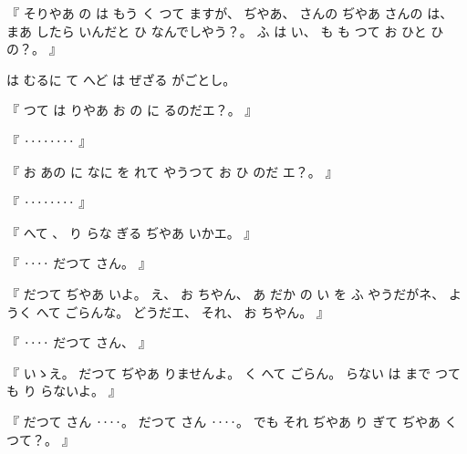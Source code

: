 %
『
そりやあ
の
は
もう
く
つて
ますが、
%
ぢやあ、
%
さんの
ぢやあ
さんの
は、
%
まあ
したら
いんだと
ひ
なんでしやう？。
%
ふ
は
い、
%
も
も
つて
お
ひと
ひの？。
』

%
は
むるに
て
へど
は
ぜざる
がごとし。

%
『
つて
は
りやあ
お
の
に
るのだエ？。
』

%
『
‥‥‥‥
』

%
『
お
あの
に
なに
を
れて
やうつて
お
ひ
のだ
エ？。
』

%
『
‥‥‥‥
』

%
『
へて
、
%
り
らな
ぎる
ぢやあ
いかエ。
』

%
『
‥‥
だつて
さん。
』

%
『
だつて
ぢやあ
いよ。
%
え、
%
お
ちやん、
%
あ
だか
の
い
を
ふ
やうだがネ、
%
ようく
へて
ごらんな。
%
どうだエ、
それ、
%
お
ちやん。
』

%
『
‥‥
だつて
さん、
』

%
『
いゝえ。
%
だつて
ぢやあ
りませんよ。
%
く
へて
ごらん。
%
らない
は
まで
つても
り%
らないよ。
』

%
『
だつて
さん
‥‥。
%
だつて
さん
‥‥。
%
でも
それ
ぢやあ
り
ぎて
ぢやあ
くつて？。
』
